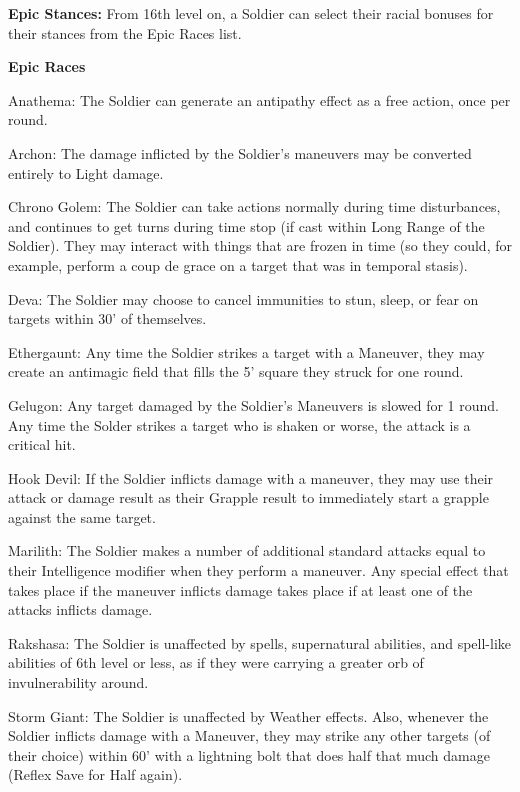 \textbf{Epic Stances:} From 16th level on, a Soldier can select their racial bonuses for their stances from the Epic Races list.

\textbf{Epic Races}
\begin{description*}
\item[Anathema:] The Soldier can generate an antipathy effect as a free action, once per round.
\item[Archon:] The damage inflicted by the Soldier's maneuvers may be converted entirely to Light damage.
\item[Chrono Golem:] The Soldier can take actions normally during time disturbances, and continues to get turns during time stop (if cast within Long Range of the Soldier). They may interact with things that are frozen in time (so they could, for example, perform a coup de grace on a target that was in temporal stasis).
\item[Deva:] The Soldier may choose to cancel immunities to stun, sleep, or fear on targets within 30' of themselves.
\item[Ethergaunt:] Any time the Soldier strikes a target with a Maneuver, they may create an antimagic field that fills the 5' square they struck for one round.
\item[Gelugon:] Any target damaged by the Soldier's Maneuvers is slowed for 1 round. Any time the Solder strikes a target who is shaken or worse, the attack is a critical hit.
\item[Hook Devil:] If the Soldier inflicts damage with a maneuver, they may use their attack or damage result as their Grapple result to immediately start a grapple against the same target.
\item[Marilith:] The Soldier makes a number of additional standard attacks equal to their Intelligence modifier when they perform a maneuver. Any special effect that takes place if the maneuver inflicts damage takes place if at least one of the attacks inflicts damage.
\item[Rakshasa:] The Soldier is unaffected by spells, supernatural abilities, and spell-like abilities of 6th level or less, as if they were carrying a greater orb of invulnerability around.
\item[Storm Giant:] The Soldier is unaffected by Weather effects. Also, whenever the Soldier inflicts damage with a Maneuver, they may strike any other targets (of their choice) within 60' with a lightning bolt that does half that much damage (Reflex Save for Half again).
\end{description*}

